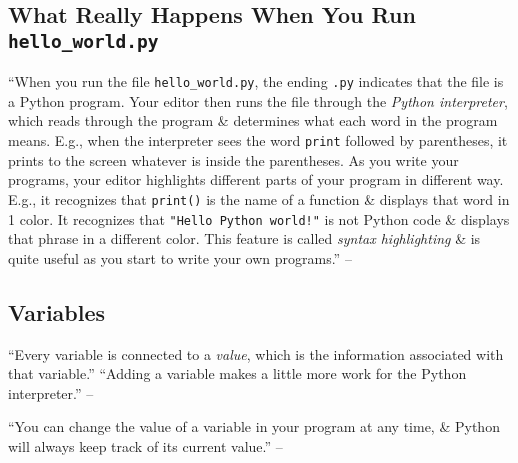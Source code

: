 \documentclass[oneside]{book}
\numberwithin{equation}{section}
\begin{document}
\subsection{What Really Happens When You Run \texttt{hello\_world.py}}
``When you run the file \verb|hello_world.py|, the ending \texttt{.py} indicates that the file is a Python program. Your editor then runs the file through the \textit{Python interpreter}, which reads through the program \& determines what each word in the program means. E.g., when the interpreter sees the word \texttt{print} followed by parentheses, it prints to the screen whatever is inside the parentheses. As you write your programs, your editor highlights different parts of your program in different way. E.g., it recognizes that \texttt{print()} is the name of a function \& displays that word in 1 color. It recognizes that \texttt{"Hello Python world!"} is not Python code \& displays that phrase in a different color. This feature is called \textit{syntax highlighting} \& is quite useful as you start to write your own programs.'' -- \cite[p. 16]{Matthes2019}

\subsection{Variables}
``Every variable is connected to a \textit{value}, which is the information associated with that variable.'' ``Adding a variable makes a little more work for the Python interpreter.'' -- \cite[p. 16]{Matthes2019}

``You can change the value of a variable in your program at any time, \& Python will always keep track of its current value.'' -- \cite[p. 17]{Matthes2019}
\end{document}
